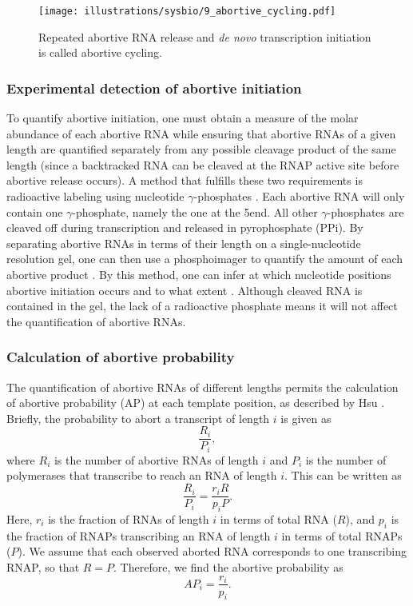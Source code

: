 \begin{figure}[htb]
	\begin{center}
		\texttt{[image: illustrations/sysbio/9\_abortive\_cycling.pdf]}
	\end{center}
	\caption{Repeated abortive RNA release and \textit{de novo} transcription
	initiation is called abortive cycling.}
	\label{fig:abortive_cycling}
\end{figure}

\subsubsection{Experimental detection of abortive initiation}
To quantify abortive initiation, one must obtain a measure of the molar
abundance of each abortive RNA while ensuring that abortive RNAs of a given
length are quantified separately from any possible cleavage product of the same
length (since a backtracked RNA can be cleaved at the RNAP active site before
abortive release occurs). A method that fulfills these two requirements is
radioactive labeling using nucleotide $\gamma$-phosphates
\cite{hsu_monitoring_2009}. Each abortive RNA will only contain one
$\gamma$-phosphate, namely the one at the 5\ppp end. All other
$\gamma$-phosphates are cleaved off during transcription and released in
pyrophosphate (PPi). By separating abortive RNAs in terms of their length on a
single-nucleotide resolution gel, one can then use a phosphoimager to quantify
the amount of each abortive product \cite{hsu_monitoring_2009}. By this method,
one can infer at which nucleotide positions abortive initiation occurs and to
what extent \cite{hsu_vitro_2003}. Although cleaved RNA is contained in
the gel, the lack of a radioactive phosphate means it will not affect the
quantification of abortive RNAs.

\subsubsection{Calculation of abortive probability}
The quantification of abortive RNAs of different lengths permits the
calculation of abortive probability (AP) at each template position, as
described by Hsu \cite{hsu_quantitative_1996}. Briefly, the probability to
abort a transcript of length $i$ is given as 
\begin{equation*}
    \frac{R_i}{P_i},
\end{equation*}
where $R_i$ is the number of abortive RNAs of length $i$ and $P_i$ is the
number of polymerases that transcribe to reach an RNA of length $i$. This can
be written as
\begin{equation*}
    \frac{R_i}{P_i} = \frac{r_iR}{p_iP}.
\end{equation*}
Here, $r_i$ is the fraction of RNAs of length $i$ in terms of total RNA ($R$),
and $p_i$ is the fraction of RNAPs transcribing an RNA of length $i$ in terms
of total RNAPs ($P$). We assume that each observed aborted RNA corresponds to
one transcribing RNAP, so that $R = P$. Therefore, we find the abortive
probability as 
\begin{equation*}
    AP_i = \frac{r_i}{p_i}.
\end{equation*}

